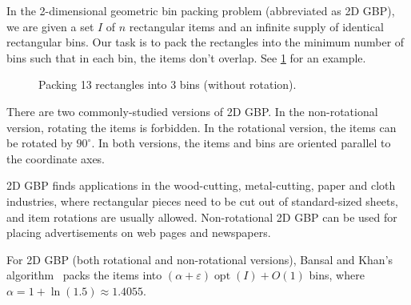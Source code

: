 \documentclass[a4paper,12pt,fleqn]{article}
\DeclareMathOperator{\opt}{opt}
\let\eps\varepsilon
\begin{document}
In the 2-dimensional geometric bin packing problem (abbreviated as 2D GBP),
we are given a set $I$ of $n$ rectangular items and an infinite supply
of identical rectangular bins.
Our task is to pack the rectangles into the minimum number of bins such that
in each bin, the items don't overlap.
See \cref{fig:2gbp} for an example.

\begin{figure}[htb]
\centering

\caption{Packing 13 rectangles into 3 bins (without rotation).}
\label{fig:2gbp}
\end{figure}

There are two commonly-studied versions of 2D GBP.
In the non-rotational version, rotating the items is forbidden.
In the rotational version, the items can be rotated by $90^{\circ}$.
In both versions, the items and bins are oriented parallel to the coordinate axes.

2D GBP finds applications in the wood-cutting, metal-cutting, paper and cloth industries,
where rectangular pieces need to be cut out of standard-sized sheets,
and item rotations are usually allowed.
Non-rotational 2D GBP can be used for placing advertisements on web pages and newspapers.

For 2D GBP (both rotational and non-rotational versions),
Bansal and Khan's algorithm~\cite{bansal2014binpacking}
packs the items into $(\alpha+\eps)\opt(I)+O(1)$ bins, where
$\alpha = 1 + \ln(1.5) \approx 1.4055$.



\end{document}
